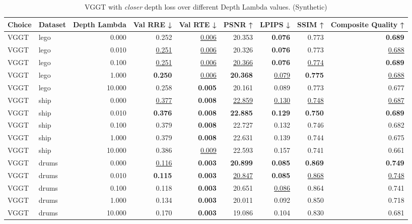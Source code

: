 \begin{table}[H]
\caption{\ifdefined\customcaption \customcaption \else VGGT with \textit{closer} depth loss over different Depth Lambda values. (Synthetic) \fi}
\label{tab:05_depth_lambda_synthetic}
\centering
\scriptsize
\begin{tabular}{llrrrrrrr}
\toprule
Choice & Dataset & Depth Lambda & Val RRE ↓ & Val RTE ↓ & PSNR ↑ & LPIPS ↓ & SSIM ↑ & Composite Quality ↑ \\
\midrule
VGGT & lego & 0.000 & 0.252 & \underline{0.006} & 20.353 & \textbf{0.076} & 0.773 & \textbf{0.689} \\
VGGT & lego & 0.010 & \underline{0.251} & \underline{0.006} & 20.326 & \textbf{0.076} & 0.773 & \underline{0.688} \\
VGGT & lego & 0.100 & \underline{0.251} & \underline{0.006} & \underline{20.366} & \textbf{0.076} & \underline{0.774} & \textbf{0.689} \\
VGGT & lego & 1.000 & \textbf{0.250} & \underline{0.006} & \textbf{20.368} & \underline{0.079} & \textbf{0.775} & \underline{0.688} \\
VGGT & lego & 10.000 & 0.258 & \textbf{0.005} & 20.161 & 0.089 & 0.773 & 0.677 \\
\midrule
VGGT & ship & 0.000 & \underline{0.377} & \textbf{0.008} & \underline{22.859} & \underline{0.130} & \underline{0.748} & \underline{0.687} \\
VGGT & ship & 0.010 & \textbf{0.376} & \textbf{0.008} & \textbf{22.885} & \textbf{0.129} & \textbf{0.750} & \textbf{0.689} \\
VGGT & ship & 0.100 & 0.379 & \textbf{0.008} & 22.727 & 0.132 & 0.746 & 0.682 \\
VGGT & ship & 1.000 & 0.379 & \textbf{0.008} & 22.631 & 0.139 & 0.744 & 0.675 \\
VGGT & ship & 10.000 & 0.386 & \underline{0.009} & 22.593 & 0.157 & 0.741 & 0.661 \\
\midrule
VGGT & drums & 0.000 & \underline{0.116} & \textbf{0.003} & \textbf{20.899} & \textbf{0.085} & \textbf{0.869} & \textbf{0.749} \\
VGGT & drums & 0.010 & \textbf{0.115} & \textbf{0.003} & \underline{20.847} & \textbf{0.085} & \underline{0.868} & \underline{0.748} \\
VGGT & drums & 0.100 & 0.118 & \textbf{0.003} & 20.651 & \underline{0.086} & 0.864 & 0.741 \\
VGGT & drums & 1.000 & 0.134 & \textbf{0.003} & 20.011 & 0.092 & 0.850 & 0.718 \\
VGGT & drums & 10.000 & 0.170 & \textbf{0.003} & 19.086 & 0.104 & 0.830 & 0.681 \\
\bottomrule
\end{tabular}
\end{table}